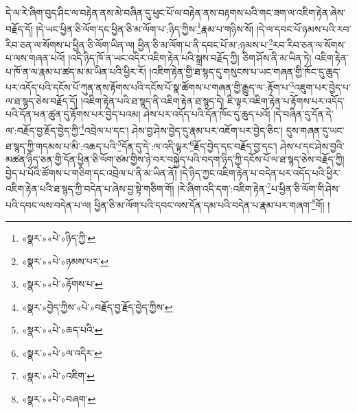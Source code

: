 དེ་ལ་རེ་ཞིག་བུད་ཤིང་ལ་བརྟེན་ནས་མེ་བཞིན་དུ་ཕུང་པོ་ལ་བརྟེན་ནས་བརྟགས་པའི་གང་ཟག་ལ་འཇིག་རྟེན་ཞེས་བརྗོད་དོ། །དེ་ཡང་ཕྱིན་ཅི་ལོག་དང་ཕྱིན་ཅི་མ་ལོག་པ་:ཉིད་ཀྱིས་\footnote{«སྣར་»«པེ་»ཉིད་ཀྱི་}རྣམ་པ་གཉིས་སོ། །དེ་ལ་དབང་པོ་ཉམས་པའི་རབ་རིབ་ཅན་ལ་སོགས་པ་ཕྱིན་ཅི་ལོག་ཡིན་ལ། ཕྱིན་ཅི་མ་ལོག་པ་ནི་དབང་པོ་མ་:ཉམས་པ་\footnote{«སྣར་»«པེ་»ཉམས་པར་}རབ་རིབ་ཅན་ལ་སོགས་པ་ལས་གཞན་པའོ། །འདི་ཉིད་ཁོ་ན་ཡང་འདིར་འཇིག་རྟེན་པའི་སྒྲས་བརྗོད་ཀྱི། ཅིག་ཤོས་ནི་མ་ཡིན་ཏེ། འཇིག་རྟེན་པ་ཁོ་ན་ལ་རྣམ་པ་ཚད་མ་མ་ཡིན་པའི་ཕྱིར་རོ། །འཇིག་རྟེན་གྱི་ཐ་སྙད་དུ་གསུངས་པ་ཡང་གཞན་གྱི་ཁོང་དུ་ཆུད་པར་འདོད་པའི་དངོས་པོ་ཀུན་ནས་རྟོགས་པའི་དངོས་པོ་སྣ་ཚོགས་པ་གཞན་གྱི་རྒྱུད་ལ་:རྟོག་པ་\footnote{«སྣར་»«པེ་»རྟོགས་པ་}འཇུག་པར་བྱེད་པ་ལ་ཐ་སྙད་ཅེས་བརྗོད་དོ། །འཇིག་རྟེན་པའི་ཐ་སྙད་ནི་འཇིག་རྟེན་ཐ་སྙད་དེ། ཇི་ལྟར་འཇིག་རྟེན་པ་རྟོགས་པར་འདོད་པའི་དོན་ཕན་ཚུན་དུ་རྟོགས་པར་བྱེད་པའམ། ཤེས་པར་འདོད་པའི་དོན་ཁོང་དུ་ཆུད་པའོ། །དེ་བཞིན་དུ་དོན་དེ་ལ་:བརྗོད་བྱ་རྗོད་བྱེད་ཀྱི་\footnote{«སྣར་»བྱེད་ཀྱིས་«པེ་»བརྗོད་བྱ་རྗོད་བྱེད་ཀྱིས་}འབྲེལ་པ་དང་། ཤེས་བྱ་ཤེས་བྱེད་དུ་རྣམ་པར་འཇོག་པར་བྱེད་ཅིང་། དུས་གཞན་དུ་ཡང་ཐ་སྙད་ཀྱི་གདམས་པ་མི་:འཆད་པའི་\footnote{«སྣར་»«པེ་»ཆད་པའི་}དོན་དུ་དེ་:ལ་འདི་ལྟར་\footnote{«སྣར་»«པེ་»ལ་འདིར་}རྗོད་བྱེད་དང་བརྗོད་བྱ་དང་། ཤེས་པ་དང་ཤེས་བྱའི་མཚན་ཉིད་ཅན་གྱི་དོན་ཕྱིན་ཅི་ལོག་ཙམ་གྱིས་ཉེ་བར་བསྐྱེད་པའི་བདག་ཉིད་ཀྱི་དངོས་པོ་ལ་ཐ་སྙད་ཅེས་བརྗོད་ཀྱི། བྱེད་པ་པོའི་ཚོགས་པ་གཅིག་དང་འབྲེལ་པ་ནི་མ་ཡིན་ནོ། །དེ་ཉིད་ཀྱང་འཇིག་རྟེན་པ་བདེན་པར་འདོད་པའི་ཕྱིར་འཇིག་རྟེན་པའི་ཐ་སྙད་ཀྱི་བདེན་པ་ཞེས་བྱ་སྟེ་གཅིག་གོ། །རེ་ཞིག་འདི་དག་:འཇིག་རྟེན་\footnote{«སྣར་»«པེ་»འཇིག་}པ་ཕྱིན་ཅི་ལོག་གི་ཤེས་པའི་དབང་ལས་བདེན་པ་ལ། ཕྱིན་ཅི་མ་ལོག་པའི་དབང་ལས་དོན་དམ་པའི་བདེན་པ་རྣམ་པར་གཞག་\footnote{«སྣར་»«པེ་»བཞག་}གོ། །
